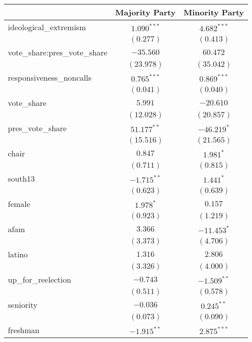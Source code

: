 \documentclass[12pt]{article}
\begin{document}
\begin{table}
	\begin{center}
		\begin{tabular}{l c c }
			\hline
			& Majority Party & Minority Party \\
			\hline
			ideological\_extremism        & $1.090^{***}$ & $4.682^{***}$ \\
			& $(0.277)$     & $(0.413)$     \\
			vote\_share:pres\_vote\_share & $-35.560$     & $60.472$      \\
			& $(23.978)$    & $(35.042)$    \\
			responsiveness\_noncalls      & $0.765^{***}$ & $0.869^{***}$ \\
			& $(0.041)$     & $(0.040)$     \\
			vote\_share                   & $5.991$       & $-20.610$     \\
			& $(12.028)$    & $(20.857)$    \\
			pres\_vote\_share             & $51.177^{**}$ & $-46.219^{*}$ \\
			& $(15.516)$    & $(21.565)$    \\
			chair                         & $0.847$       & $1.981^{*}$   \\
			& $(0.711)$     & $(0.815)$     \\
			south13                       & $-1.715^{**}$ & $1.441^{*}$   \\
			& $(0.623)$     & $(0.639)$     \\
			female                        & $1.978^{*}$   & $0.157$       \\
			& $(0.923)$     & $(1.219)$     \\
			afam                          & $3.366$       & $-11.453^{*}$ \\
			& $(3.373)$     & $(4.706)$     \\
			latino                        & $1.316$       & $2.806$       \\
			& $(3.326)$     & $(4.000)$     \\
			up\_for\_reelection           & $-0.743$      & $-1.509^{**}$ \\
			& $(0.511)$     & $(0.578)$     \\
			seniority                     & $-0.036$      & $0.245^{**}$  \\
			& $(0.073)$     & $(0.090)$     \\
			freshman                      & $-1.915^{**}$ & $2.875^{***}$ \\

\end{tabular}
\end{center}
\end{table}
\end{document}
